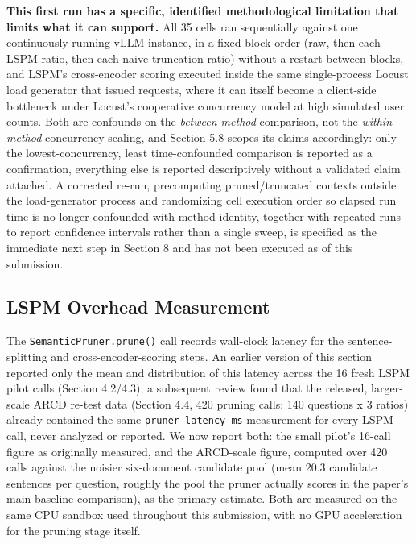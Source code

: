 \textbf{This first run has a specific, identified methodological limitation that limits what it can support.} All 35 cells ran sequentially against one continuously running vLLM instance, in a fixed block order (raw, then each LSPM ratio, then each naive-truncation ratio) without a restart between blocks, and LSPM's cross-encoder scoring executed inside the same single-process Locust load generator that issued requests, where it can itself become a client-side bottleneck under Locust's cooperative concurrency model at high simulated user counts. Both are confounds on the \textit{between-method} comparison, not the \textit{within-method} concurrency scaling, and Section 5.8 scopes its claims accordingly: only the lowest-concurrency, least time-confounded comparison is reported as a confirmation, everything else is reported descriptively without a validated claim attached. A corrected re-run, precomputing pruned/truncated contexts outside the load-generator process and randomizing cell execution order so elapsed run time is no longer confounded with method identity, together with repeated runs to report confidence intervals rather than a single sweep, is specified as the immediate next step in Section 8 and has not been executed as of this submission.

\subsection{LSPM Overhead Measurement}
The \texttt{SemanticPruner.prune()} call records wall-clock latency for the sentence-splitting and cross-encoder-scoring steps. An earlier version of this section reported only the mean and distribution of this latency across the 16 fresh LSPM pilot calls (Section 4.2/4.3); a subsequent review found that the released, larger-scale ARCD re-test data (Section 4.4, 420 pruning calls: 140 questions x 3 ratios) already contained the same \texttt{pruner\_latency\_ms} measurement for every LSPM call, never analyzed or reported. We now report both: the small pilot's 16-call figure as originally measured, and the ARCD-scale figure, computed over 420 calls against the noisier six-document candidate pool (mean 20.3 candidate sentences per question, roughly the pool the pruner actually scores in the paper's main baseline comparison), as the primary estimate. Both are measured on the same CPU sandbox used throughout this submission, with no GPU acceleration for the pruning stage itself.

